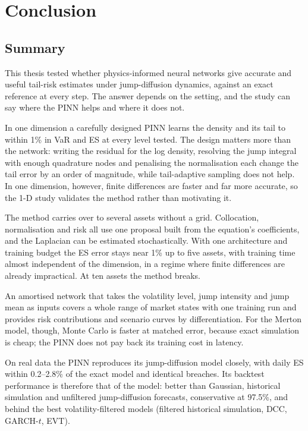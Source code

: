 \chapter{Conclusion}
\label{ch:conclusion}

\section{Summary}
This thesis tested whether physics-informed neural networks give accurate and useful tail-risk estimates under
jump-diffusion dynamics, against an exact reference at every step. The answer depends on the setting, and the
study can say where the PINN helps and where it does not.

In one dimension a carefully designed PINN learns the density and its tail to within 1\% in VaR and ES at every
level tested. The design matters more than the network: writing the residual for the log density, resolving the
jump integral with enough quadrature nodes and penalising the normalisation each change the tail error by an order
of magnitude, while tail-adaptive sampling does not help. In one dimension, however, finite differences are faster
and far more accurate, so the 1-D study validates the method rather than motivating it.

The method carries over to several assets without a grid. Collocation, normalisation and risk all use one proposal
built from the equation's coefficients, and the Laplacian can be estimated stochastically. With one architecture and
training budget the ES error stays near 1\% up to five assets, with training time almost independent of the
dimension, in a regime where finite differences are already impractical. At ten assets the method breaks.

An amortised network that takes the volatility level, jump intensity and jump mean as inputs covers a whole range of
market states with one training run and provides risk contributions and scenario curves by differentiation. For the
Merton model, though, Monte Carlo is faster at matched error, because exact simulation is cheap; the PINN does not pay
back its training cost in latency.

On real data the PINN reproduces its jump-diffusion model closely, with daily ES within 0.2--2.8\% of the exact model
and identical breaches. Its backtest performance is therefore that of the model: better than Gaussian, historical
simulation and unfiltered jump-diffusion forecasts, conservative at 97.5\%, and behind the best volatility-filtered
models (filtered historical simulation, DCC, GARCH-$t$, EVT).

